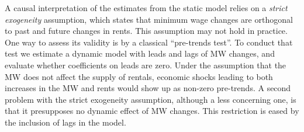 A causal interpretation of the estimates from the static model relies on a \textit{strict exogeneity} 
assumption, which states that minimum wage changes are orthogonal to past and future changes in rents.
This assumption may not hold in practice. One way to assess its validity is by a classical 
``pre-trends test''. To conduct that test we estimate a dynamic model with leads and lags of MW 
changes, and evaluate whether coefficients on leads are zero. Under the assumption that the MW does 
not affect the supply of rentals, economic shocks leading to both increases in the MW and rents would 
show up as non-zero pre-trends. A second problem with the strict exogeneity assumption, although a less 
concerning one, is that it presupposes no dynamic effect of MW changes. This restriction is eased by 
the inclusion of lags in the model.

